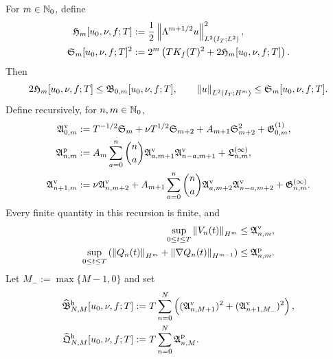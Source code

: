 \begin{proposition}
\label{prop:qc-critical-height-row-propagation}
For \(m\in\mathbb N_0\), define
\begin{align}
 \mathfrak H_m[u_0,\nu,f;T]
 &:={}
 \frac12\left\lVert \Lambda^{m+1/2}u\right\rVert_{L^2(I_T;L^2)}^2,
 \label{eq:qc-height-producer-coordinate}\\
 \mathfrak S_m[u_0,\nu,f;T]^2
 &:={}
 2^m\left(TK_f(T)^2+2\mathfrak H_m[u_0,\nu,f;T]\right).
 \label{eq:qc-spatial-row-from-height}
\end{align}
Then
\begin{equation}
 2\mathfrak H_m[u_0,\nu,f;T]
 \le\mathfrak B_{0,m}[u_0,\nu,f;T],
 \qquad
 \left\lVert u\right\rVert_{L^2(I_T;H^m)}\le\mathfrak S_m[u_0,\nu,f;T].
 \label{eq:qc-height-spatial-bounds}
\end{equation}
Define recursively, for \(n,m\in\mathbb N_0\),
\begin{align}
 \mathfrak A^{\rm v}_{0,m}
 &:={}
 T^{-1/2}\mathfrak S_m
 +\nu T^{1/2}\mathfrak S_{m+2}
 +A_{m+1}\mathfrak S_{m+2}^2
 +\mathfrak G^{(1)}_{0,m},
 \label{eq:qc-height-base-pointwise-majorant}\\
 \mathfrak A^{\rm p}_{n,m}
 &:={}
 A_m\sum_{a=0}^{n}\binom na
 \mathfrak A^{\rm v}_{a,m+1}
 \mathfrak A^{\rm v}_{n-a,m+1}
 +\mathfrak L^{(\infty)}_{n,m},
 \label{eq:qc-height-pressure-majorant}\\
 \mathfrak A^{\rm v}_{n+1,m}
 &:={}
 \nu\mathfrak A^{\rm v}_{n,m+2}
 +A_{m+1}\sum_{a=0}^{n}\binom na
 \mathfrak A^{\rm v}_{a,m+2}
 \mathfrak A^{\rm v}_{n-a,m+2}
 +\mathfrak G^{(\infty)}_{n,m}.
 \label{eq:qc-height-temporal-majorant}
\end{align}
Every finite quantity in this recursion is finite, and
\begin{align}
 \sup_{0\le t\le T}\left\lVert V_n(t)\right\rVert_{H^m}
 &\le\mathfrak A^{\rm v}_{n,m},
 \label{eq:qc-height-temporal-row-bound}\\
 \sup_{0\le t\le T}
 \left(\left\lVert Q_n(t)\right\rVert_{H^m}
 +\left\lVert \nabla Q_n(t)\right\rVert_{H^{m-1}}\right)
 &\le\mathfrak A^{\rm p}_{n,m}.
 \label{eq:qc-height-pressure-row-bound}
\end{align}
Let \(M_-:=\max\{M-1,0\}\) and set
\begin{align}
 \widehat{\mathfrak B}_{N,M}^{\rm h}[u_0,\nu,f;T]
 &:={}
 T\sum_{n=0}^{N}\left(
 (\mathfrak A^{\rm v}_{n,M+1})^2
 +(\mathfrak A^{\rm v}_{n+1,M_-})^2
 \right),
 \label{eq:qc-height-reconstructed-rectangle}\\
 \widehat{\mathfrak Q}_{N,M}^{\rm h}[u_0,\nu,f;T]
 &:={}
 T\sum_{n=0}^{N}\mathfrak A^{\rm p}_{n,M}.

\end{align}
\end{proposition}
